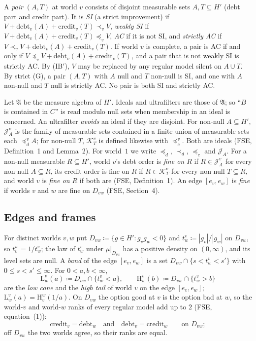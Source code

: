 \documentclass[11pt]{article}
\theoremstyle{definition}\newtheorem{definition}[theorem]{Definition}
\theoremstyle{remark}\newtheorem{remark}[theorem]{Remark}
\newcommand{\debt}{\mathrm{debt}}
\newcommand{\cred}{\mathrm{credit}}
\newcommand{\Jid}{\mathcal J}
\newcommand{\Alg}{\mathfrak A}
\newcommand{\Lo}[3]{\mathrm L^{#1}_{#2}(#3)}
\newcommand{\Hi}[3]{\mathrm H^{#1}_{#2}(#3)}
\begin{document}
A \emph{pair} $(A,T)$ at world $v$ consists of disjoint measurable sets
$A,T\subseteq H'$ (debt part and credit part). It is \emph{SI} (a strict
improvement) if $V+\debt_v(A)+\cred_v(T)\prec_vV$, \emph{weakly SI} if
$V+\debt_v(A)+\cred_v(T)\preceq_vV$, \emph{AC} if it is not SI, and
\emph{strictly AC} if $V\prec_vV+\debt_v(A)+\cred_v(T)$. If world $v$ is
complete, a pair is AC if and only if $V\preceq_vV+\debt_v(A)+\cred_v(T)$,
and a pair that is not weakly SI is strictly AC. By (IB$'$), $V$ may be
replaced by any regular model silent on $A\cup T$. By strict (G), a pair
$(A,T)$ with $A$ null and $T$ non-null is SI, and one with $A$ non-null and
$T$ null is strictly AC. No pair is both SI and strictly AC.

Let $\Alg$ be the measure algebra of $H'$. Ideals and ultrafilters are
those of $\Alg$; so ``$B$ is contained in $C$'' is read modulo null sets
when membership in an ideal is concerned. An ultrafilter \emph{avoids} an
ideal if they are disjoint. For non-null $A\subseteq H'$, $\Jid^v_A$ is
the family of measurable sets contained in a finite union of measurable
sets each $\preceq^v_dA$; for non-null $T$, $\mathcal K^v_T$ is defined
likewise with $\preceq^v_c$. Both are ideals (FSE, Definition~1 and
Lemma~2). For world~$1$ we write $\preceq_d$, $\prec_d$, $\preceq_c$ and
$\Jid_A$. For a non-null measurable $R\subseteq H'$, world $v$'s debt order
is \emph{fine on $R$} if $R\in\Jid^v_A$ for every non-null $A\subseteq R$,
its credit order is fine on $R$ if $R\in\mathcal K^v_T$ for every non-null
$T\subseteq R$, and world $v$ is \emph{fine on $R$} if both are (FSE,
Definition~1). An edge $[e_v,e_w]$ is \emph{fine} if worlds $v$ and $w$
are fine on $D_{vw}$ (FSE, Section~4).

\subsection{Edges and frames}\label{sec:edges}

For distinct worlds $v,w$ put $D_{vw}\coloneqq\{g\in H':g_vg_w<0\}$ and
$t^v_w\coloneqq|g_v|/|g_w|$ on $D_{vw}$, so $t^w_v=1/t^v_w$; the law of
$t^v_w$ under $\mu|_{D_{vw}}$ has a positive density on $(0,\infty)$, and
its level sets are null. A \emph{band} of the edge $[e_v,e_w]$ is a set
$D_{vw}\cap\{s<t^v_w<s'\}$ with $0\le s<s'\le\infty$. For $0<a,b<\infty$,
\[
 \Lo vwa\coloneqq D_{vw}\cap\{t^v_w<a\},\qquad
 \Hi vwb\coloneqq D_{vw}\cap\{t^v_w>b\}
\]
are the \emph{low cone} and the \emph{high tail} of world $v$ on the edge
$[e_v,e_w]$; $\Lo vwa=\Hi wv{1/a}$. On $D_{vw}$ the option good at $v$ is
the option bad at $w$, so the world-$v$ and world-$w$ ranks of every
regular model add up to $2$ (FSE, equation~(1)):
\begin{equation}
 \cred_v=\debt_w\quad\text{and}\quad\debt_v=\cred_w\qquad\text{on }D_{vw};
 \label{eq:swap}
\end{equation}
off $D_{vw}$ the two worlds agree, so their ranks are equal.
\end{document}
